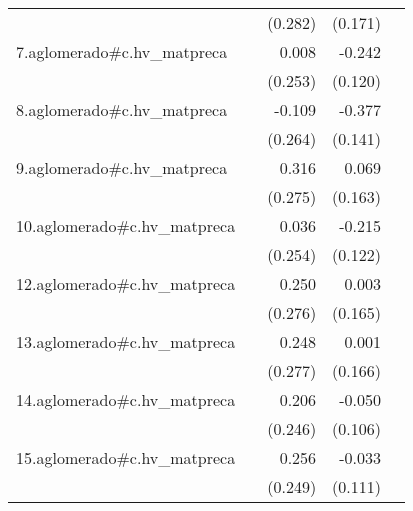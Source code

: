 {\begin{longtable}{l*{4}{D{.}{.}{-1}}}
            &                     &     (0.282)         &     (0.171)         &                     \\
\addlinespace
7.aglomerado#c.hv\_matpreca&                     &       0.008         &      -0.242\sym{*}  &                     \\
            &                     &     (0.253)         &     (0.120)         &                     \\
\addlinespace
8.aglomerado#c.hv\_matpreca&                     &      -0.109         &      -0.377\sym{**} &                     \\
            &                     &     (0.264)         &     (0.141)         &                     \\
\addlinespace
9.aglomerado#c.hv\_matpreca&                     &       0.316         &       0.069         &                     \\
            &                     &     (0.275)         &     (0.163)         &                     \\
\addlinespace
10.aglomerado#c.hv\_matpreca&                     &       0.036         &      -0.215         &                     \\
            &                     &     (0.254)         &     (0.122)         &                     \\
\addlinespace
12.aglomerado#c.hv\_matpreca&                     &       0.250         &       0.003         &                     \\
            &                     &     (0.276)         &     (0.165)         &                     \\
\addlinespace
13.aglomerado#c.hv\_matpreca&                     &       0.248         &       0.001         &                     \\
            &                     &     (0.277)         &     (0.166)         &                     \\
\addlinespace
14.aglomerado#c.hv\_matpreca&                     &       0.206         &      -0.050         &                     \\
            &                     &     (0.246)         &     (0.106)         &                     \\
\addlinespace
15.aglomerado#c.hv\_matpreca&                     &       0.256         &      -0.033         &                     \\
            &                     &     (0.249)         &     (0.111)         &                     \\

\end{longtable}}
